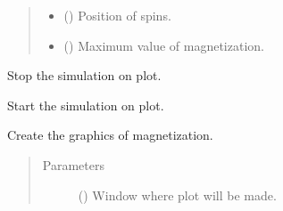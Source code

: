 \documentclass[a4paper,10pt,english]{sphinxmanual}
\begin{document}
\begin{fulllineitems}
\begin{quote}
\begin{description}
\begin{itemize}
\item {} 
 () \textendash{} Position of spins.

\item {} 
 () \textendash{} Maximum value of magnetization.

\end{itemize}

\end{description}\end{quote}

\begin{fulllineitems}
\label{\detokenize{autodoc/mrsprint/mrsprint.simulator:mrsprint.simulator.plot.Plot.pause}}
Stop the simulation on plot.

\end{fulllineitems}


\begin{fulllineitems}
\label{\detokenize{autodoc/mrsprint/mrsprint.simulator:mrsprint.simulator.plot.Plot.play}}
Start the simulation on plot.

\end{fulllineitems}


\begin{fulllineitems}
\label{\detokenize{autodoc/mrsprint/mrsprint.simulator:mrsprint.simulator.plot.Plot.plotMagnetization}}
Create the graphics of magnetization.
\begin{quote}\begin{description}
\item[{Parameters}] \leavevmode
{} () \textendash{} Window where plot will be made.

\end{description}\end{quote}


\end{fulllineitems}
\end{fulllineitems}
\end{document}
